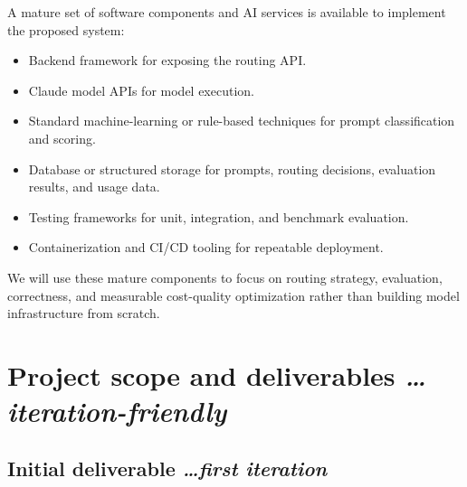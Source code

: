 \documentclass[11pt,a4paper]{article}
\newcommand{\BvrHint}[1]{%
  {\normalfont\normalsize\itshape\hfill #1}%
}
\begin{document}
A mature set of software components and AI services is
available to implement the proposed system:

\begin{itemize}[leftmargin=0.7cm]

    \item Backend framework for exposing the routing API.

    \item Claude model APIs for model execution.

    \item Standard machine-learning or rule-based techniques
    for prompt classification and scoring.

    \item Database or structured storage for prompts,
    routing decisions, evaluation results, and usage data.

    \item Testing frameworks for unit, integration, and
    benchmark evaluation.

    \item Containerization and CI/CD tooling for repeatable
    deployment.

\end{itemize}

We will use these mature components to focus on routing
strategy, evaluation, correctness, and measurable
cost-quality optimization rather than building model
infrastructure from scratch.

\section{Project scope and deliverables%
  \texorpdfstring{\BvrHint{\ldots iteration-friendly}}{}}

\subsection{Initial deliverable%
  \texorpdfstring{\BvrHint{\ldots first iteration}}{}}
\end{document}
